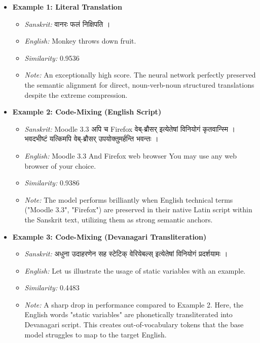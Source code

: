 \documentclass[11pt]{article}
\begin{document}
\begin{itemize}[leftmargin=*]
    \item \textbf{Example 1: Literal Translation}
    \begin{itemize}
        \item \textit{Sanskrit:} वानरः फलं निक्षिपति ।
        \item \textit{English:} Monkey throws down fruit.
        \item \textit{Similarity:} 0.9536
        \item \textit{Note:} An exceptionally high score. The neural network perfectly preserved the semantic alignment for direct, noun-verb-noun structured translations despite the extreme compression.
    \end{itemize}

    \item \textbf{Example 2: Code-Mixing (English Script)}
    \begin{itemize}
        \item \textit{Sanskrit:} Moodle 3.3 अपि च Firefox वेब्-ब्रौसर् इत्येतेषां विनियोगं कृतवान्स्मि । भवदभीष्टं यत्किमपि वेब्-ब्रौसर् उपयोक्तुमर्हन्ति भवन्तः ।
        \item \textit{English:} Moodle 3.3 And Firefox web browser You may use any web browser of your choice.
        \item \textit{Similarity:} 0.9386
        \item \textit{Note:} The model performs brilliantly when English technical terms ("Moodle 3.3", "Firefox") are preserved in their native Latin script within the Sanskrit text, utilizing them as strong semantic anchors.
    \end{itemize}

    \item \textbf{Example 3: Code-Mixing (Devanagari Transliteration)}
    \begin{itemize}
        \item \textit{Sanskrit:} अधुना उदाहरणेन सह स्टेटिक् वेरियेबल्स् इत्येतेषां विनियोगं प्रदर्शयामः ।
        \item \textit{English:} Let us illustrate the usage of static variables with an example.
        \item \textit{Similarity:} 0.4483
        \item \textit{Note:} A sharp drop in performance compared to Example 2. Here, the English words "static variables" are phonetically transliterated into Devanagari script. This creates out-of-vocabulary tokens that the base model struggles to map to the target English.
    \end{itemize}
    

\end{itemize}
\end{document}
